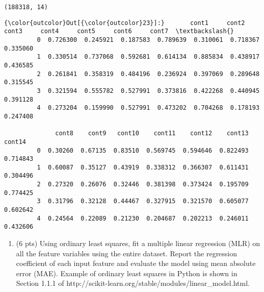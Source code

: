 \documentclass[11pt]{article}
\providecommand{\tightlist}{%
      \setlength{\itemsep}{0pt}\setlength{\parskip}{0pt}}
\begin{document}
    \begin{Verbatim}[commandchars=\\\{\}]
(188318, 14)

    \end{Verbatim}

\begin{Verbatim}[commandchars=\\\{\}]
{\color{outcolor}Out[{\color{outcolor}23}]:}       cont1     cont2     cont3     cont4     cont5     cont6     cont7  \textbackslash{}
         0  0.726300  0.245921  0.187583  0.789639  0.310061  0.718367  0.335060   
         1  0.330514  0.737068  0.592681  0.614134  0.885834  0.438917  0.436585   
         2  0.261841  0.358319  0.484196  0.236924  0.397069  0.289648  0.315545   
         3  0.321594  0.555782  0.527991  0.373816  0.422268  0.440945  0.391128   
         4  0.273204  0.159990  0.527991  0.473202  0.704268  0.178193  0.247408   
         
              cont8    cont9   cont10    cont11    cont12    cont13    cont14  
         0  0.30260  0.67135  0.83510  0.569745  0.594646  0.822493  0.714843  
         1  0.60087  0.35127  0.43919  0.338312  0.366307  0.611431  0.304496  
         2  0.27320  0.26076  0.32446  0.381398  0.373424  0.195709  0.774425  
         3  0.31796  0.32128  0.44467  0.327915  0.321570  0.605077  0.602642  
         4  0.24564  0.22089  0.21230  0.204687  0.202213  0.246011  0.432606  
\end{Verbatim}
            
    \begin{enumerate}
\def\labelenumi{\alph{enumi}.}
\setcounter{enumi}{1}
\tightlist
\item
  (6 pts) Using ordinary least squares, fit a multiple linear regression
  (MLR) on all the feature variables using the entire dataset. Report
  the regression coefficient of each input feature and evaluate the
  model using mean absolute error (MAE). Example of ordinary least
  squares in Python is shown in Section 1.1.1 of
  http://scikit-learn.org/stable/modules/linear\_model.html.
\end{enumerate}
\end{document}
